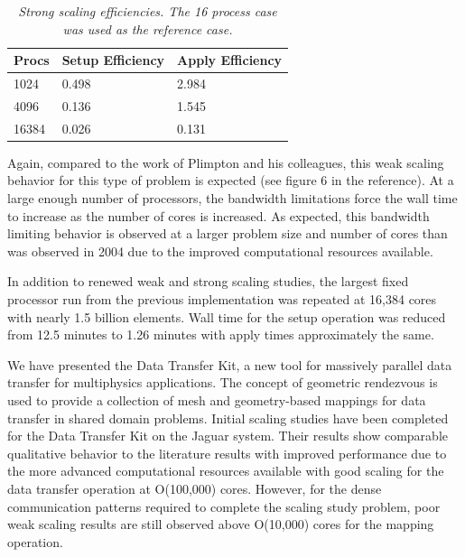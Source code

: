 \documentclass{mc2013}
\begin{document}
\begin{table}[htpb!]
  \begin{center}
    \begin{tabular}{lll}\hline\hline
      \multicolumn{1}{c}{Procs}& 
      \multicolumn{1}{c}{Setup Efficiency} & 
      \multicolumn{1}{c}{Apply Efficiency}\\\hline\hline
      1024 &	0.498 &	2.984 \\
      4096 &	0.136 &	1.545 \\
      16384 &	0.026 &	0.131 \\
      \hline\hline
    \end{tabular}
  \end{center}
  \caption{\sl Strong scaling efficiencies. The 16 process case was used
    as the reference case.}
  \label{tab:strong_efficiency}
\end{table}

Again, compared to the work of Plimpton and his colleagues, this weak
scaling behavior for this type of problem is expected (see figure 6 in
the reference).  At a large enough number of processors, the bandwidth
limitations force the wall time to increase as the number of cores is
increased. As expected, this bandwidth limiting behavior is observed
at a larger problem size and number of cores than was observed in 2004
due to the improved computational resources available.

In addition to renewed weak and strong scaling studies, the largest
fixed processor run from the previous implementation was repeated at
16,384 cores with nearly 1.5 billion elements. Wall time for the setup
operation was reduced from 12.5 minutes to 1.26 minutes with apply
times approximately the same.



We have presented the Data Transfer Kit, a new tool for massively
parallel data transfer for multiphysics applications. The concept of
geometric rendezvous is used to provide a collection of mesh and
geometry-based mappings for data transfer in shared domain problems.
Initial scaling studies have been completed for the Data Transfer Kit
on the Jaguar system. Their results show comparable qualitative
behavior to the literature results with improved performance due to
the more advanced computational resources available with good scaling
for the data transfer operation at O(100,000) cores. However, for the
dense communication patterns required to complete the scaling study
problem, poor weak scaling results are still observed above O(10,000)
cores for the mapping operation.
\end{document}
